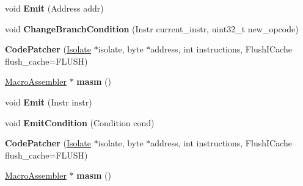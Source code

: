 \begin{DoxyCompactItemize}
\item 
void {\bfseries Emit} (Address addr)\hypertarget{classv8_1_1internal_1_1_code_patcher_a11eaccf67a0e270278fc1d0baaa74462}{}\label{classv8_1_1internal_1_1_code_patcher_a11eaccf67a0e270278fc1d0baaa74462}

\item 
void {\bfseries Change\+Branch\+Condition} (Instr current\+\_\+instr, uint32\+\_\+t new\+\_\+opcode)\hypertarget{classv8_1_1internal_1_1_code_patcher_a0fa077af3fd1e2b454bb2a78a958676d}{}\label{classv8_1_1internal_1_1_code_patcher_a0fa077af3fd1e2b454bb2a78a958676d}

\item 
{\bfseries Code\+Patcher} (\hyperlink{classv8_1_1internal_1_1_isolate}{Isolate} $\ast$isolate, byte $\ast$address, int instructions, Flush\+I\+Cache flush\+\_\+cache=F\+L\+U\+SH)\hypertarget{classv8_1_1internal_1_1_code_patcher_a6437c3f8f928a65aa12b0a188c84c137}{}\label{classv8_1_1internal_1_1_code_patcher_a6437c3f8f928a65aa12b0a188c84c137}

\item 
\hyperlink{classv8_1_1internal_1_1_macro_assembler}{Macro\+Assembler} $\ast$ {\bfseries masm} ()\hypertarget{classv8_1_1internal_1_1_code_patcher_abb06694a38d62fd0a065cf42f2d025e2}{}\label{classv8_1_1internal_1_1_code_patcher_abb06694a38d62fd0a065cf42f2d025e2}

\item 
void {\bfseries Emit} (Instr instr)\hypertarget{classv8_1_1internal_1_1_code_patcher_ac0394155d6f5e17721942404e6d3e486}{}\label{classv8_1_1internal_1_1_code_patcher_ac0394155d6f5e17721942404e6d3e486}

\item 
void {\bfseries Emit\+Condition} (Condition cond)\hypertarget{classv8_1_1internal_1_1_code_patcher_a45c72f30807f576dc05b0a53e166d40a}{}\label{classv8_1_1internal_1_1_code_patcher_a45c72f30807f576dc05b0a53e166d40a}

\item 
{\bfseries Code\+Patcher} (\hyperlink{classv8_1_1internal_1_1_isolate}{Isolate} $\ast$isolate, byte $\ast$address, int instructions, Flush\+I\+Cache flush\+\_\+cache=F\+L\+U\+SH)\hypertarget{classv8_1_1internal_1_1_code_patcher_a6437c3f8f928a65aa12b0a188c84c137}{}\label{classv8_1_1internal_1_1_code_patcher_a6437c3f8f928a65aa12b0a188c84c137}

\item 
\hyperlink{classv8_1_1internal_1_1_macro_assembler}{Macro\+Assembler} $\ast$ {\bfseries masm} ()\hypertarget{classv8_1_1internal_1_1_code_patcher_abb06694a38d62fd0a065cf42f2d025e2}{}\label{classv8_1_1internal_1_1_code_patcher_abb06694a38d62fd0a065cf42f2d025e2}


\end{DoxyCompactItemize}
